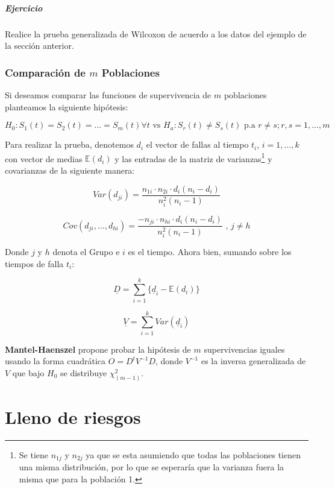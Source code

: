 \documentclass[
  a4paper,
  oneside,
  openany]{book}
\begin{document}
\hypertarget{ejercicio-2}{%
\subsubsection*{Ejercicio}\label{ejercicio-2}}


Realice la prueba generalizada de Wilcoxon de acuerdo a los datos del ejemplo de la sección anterior.

\hypertarget{comparaciuxf3n-de-m-poblaciones}{%
\section{\texorpdfstring{Comparación de \(m\) Poblaciones}{Comparación de m Poblaciones}}\label{comparaciuxf3n-de-m-poblaciones}}

Si deseamos comparar las funciones de supervivencia de \(m\) poblaciones planteamos la siguiente hipótesis:

\[
H_0:S_1(t) = S_2(t) = ... = S_m(t) \forall t \mbox{ vs } H_a:S_r(t)\neq S_s(t) \mbox{ p.a } r\neq s; r,s = 1,...,m
\]

Para realizar la prueba, denotemos \(d_{i}\) el vector de fallas al tiempo \(t_i\), \(i=1,...,k\) con vector de medias \(\mathbb{E}(d_i)\) y las entradas de la matriz de varianzas\footnote{Se tiene \(n_{1j}\) y \(n_{2j}\) ya que se esta asumiendo que todas las poblaciones tienen una misma distribución, por lo que se esperaría que la varianza fuera la misma que para la población 1.} y covarianzas de la siguiente manera:

\[
Var(d_{ji}) = \frac{n_{1i}\cdot n_{2i}\cdot d_i(n_i-d_i)}{n_i^2(n_i-1)}
\]

\[
Cov(d_{ji},...,d_{hi}) = \frac{-n_{ji}\cdot n_{hi}\cdot d_i(n_i-d_i)}{n_i^2(n_i-1)} \mbox{ , } j \neq h
\]

Donde \(j\) y \(h\) denota el Grupo e \(i\) es el tiempo. Ahora bien, sumando sobre los tiempos de falla \(t_i\):

\[
\underline{D} = \sum_{i = 1}^k\{\underline{d}_i - \mathbb{E}(d_i)\}
\]

\[
\underline{V} = \sum_{i=1}^kVar(\underline{d}_i)
\]

\textbf{Mantel-Haenszel} propone probar la hipótesis de \(m\) supervivencias iguales usando la forma cuadrática \(O = D^{t}V^{-1}D\), donde \(V^{-1}\) es la inversa generalizada de \(V\) que bajo \(H_0\) se distribuye \(\chi^2_{(m-1)}\).

\hypertarget{part-lleno-de-riesgos}{%
\part{Lleno de riesgos}\label{part-lleno-de-riesgos}}
\end{document}
